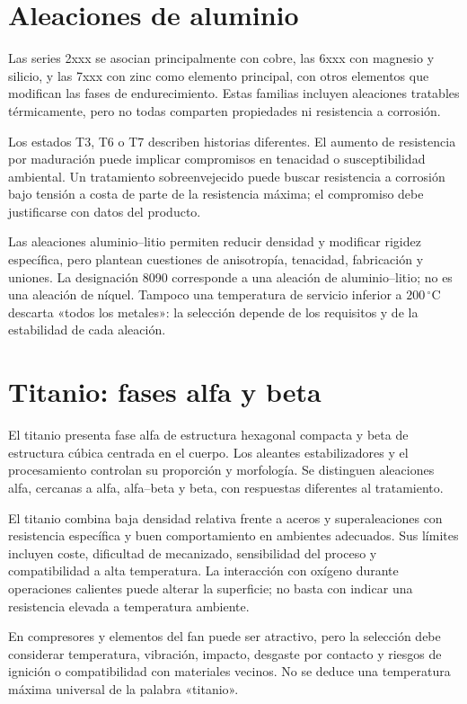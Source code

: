 \section{Aleaciones de aluminio}
Las series 2xxx se asocian principalmente con cobre, las 6xxx con magnesio y silicio, y las 7xxx con zinc como elemento principal, con otros elementos que modifican las fases de endurecimiento. Estas familias incluyen aleaciones tratables térmicamente, pero no todas comparten propiedades ni resistencia a corrosión.

Los estados T3, T6 o T7 describen historias diferentes. El aumento de resistencia por maduración puede implicar compromisos en tenacidad o susceptibilidad ambiental. Un tratamiento sobreenvejecido puede buscar resistencia a corrosión bajo tensión a costa de parte de la resistencia máxima; el compromiso debe justificarse con datos del producto.

Las aleaciones aluminio--litio permiten reducir densidad y modificar rigidez específica, pero plantean cuestiones de anisotropía, tenacidad, fabricación y uniones. La designación 8090 corresponde a una aleación de aluminio--litio; no es una aleación de níquel. Tampoco una temperatura de servicio inferior a $200\,^{\circ}\mathrm C$ descarta «todos los metales»: la selección depende de los requisitos y de la estabilidad de cada aleación.
\section{Titanio: fases alfa y beta}
El titanio presenta fase alfa de estructura hexagonal compacta y beta de estructura cúbica centrada en el cuerpo. Los aleantes estabilizadores y el procesamiento controlan su proporción y morfología. Se distinguen aleaciones alfa, cercanas a alfa, alfa--beta y beta, con respuestas diferentes al tratamiento.

El titanio combina baja densidad relativa frente a aceros y superaleaciones con resistencia específica y buen comportamiento en ambientes adecuados. Sus límites incluyen coste, dificultad de mecanizado, sensibilidad del proceso y compatibilidad a alta temperatura. La interacción con oxígeno durante operaciones calientes puede alterar la superficie; no basta con indicar una resistencia elevada a temperatura ambiente.

En compresores y elementos del fan puede ser atractivo, pero la selección debe considerar temperatura, vibración, impacto, desgaste por contacto y riesgos de ignición o compatibilidad con materiales vecinos. No se deduce una temperatura máxima universal de la palabra «titanio».
